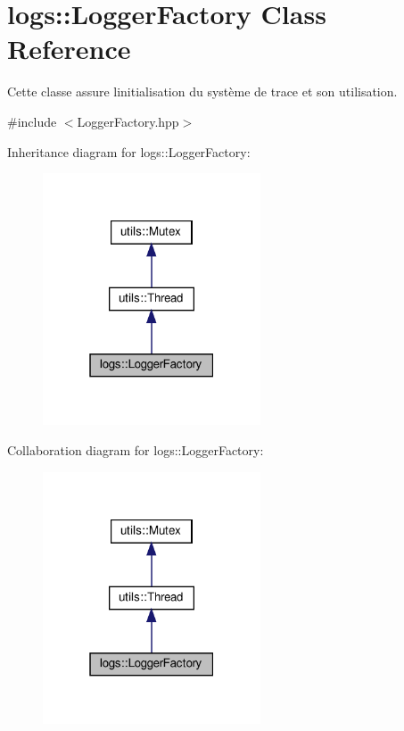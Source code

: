 \hypertarget{classlogs_1_1LoggerFactory}{}\section{logs\+:\+:Logger\+Factory Class Reference}
\label{classlogs_1_1LoggerFactory}


Cette classe assure l\textquotesingle{}initialisation du système de trace et son utilisation.  




{\ttfamily \#include $<$Logger\+Factory.\+hpp$>$}



Inheritance diagram for logs\+:\+:Logger\+Factory\+:
\nopagebreak
\begin{figure}[H]
\begin{center}
\leavevmode
\includegraphics[width=183pt]{classlogs_1_1LoggerFactory__inherit__graph}
\end{center}
\end{figure}


Collaboration diagram for logs\+:\+:Logger\+Factory\+:
\nopagebreak
\begin{figure}[H]
\begin{center}
\leavevmode
\includegraphics[width=183pt]{classlogs_1_1LoggerFactory__coll__graph}
\end{center}
\end{figure}
